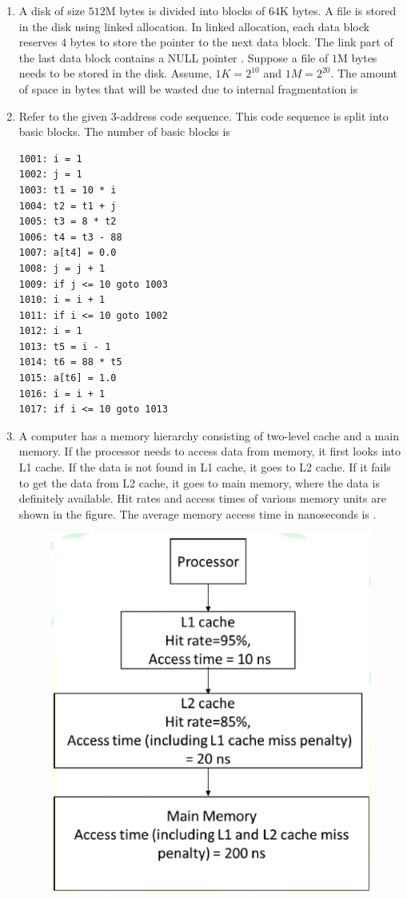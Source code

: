 \documentclass[a4paper, 11pt]{article}
\begin{document}
\begin{enumerate}
    \hfill{}

    \item A disk of size $512$M bytes is divided into blocks of $64$K bytes. A file is stored in the disk using linked allocation. In linked allocation, each data block reserves $4$ bytes to store the pointer to the next data block. The link part of the last data block contains a NULL pointer . Suppose a file of $1$M bytes needs to be stored in the disk. Assume, $1K=2^{10}$ and $1M=2^{20}$. The amount of space in bytes that will be wasted due to internal fragmentation is \underline{\hspace{2cm}} 

    \hfill{}

    \item Refer to the given 3-address code sequence. This code sequence is split into basic blocks. The number of basic blocks is \underline{\hspace{2cm}} 
    
    \begin{lstlisting}
1001: i = 1
1002: j = 1
1003: t1 = 10 * i
1004: t2 = t1 + j
1005: t3 = 8 * t2
1006: t4 = t3 - 88
1007: a[t4] = 0.0
1008: j = j + 1
1009: if j <= 10 goto 1003
1010: i = i + 1
1011: if i <= 10 goto 1002
1012: i = 1
1013: t5 = i - 1
1014: t6 = 88 * t5
1015: a[t6] = 1.0
1016: i = i + 1
1017: if i <= 10 goto 1013
    \end{lstlisting}
    \hfill{}
    \item A computer has a memory hierarchy consisting of two-level cache  and a main memory. If the processor needs to access data from memory, it first looks into L1 cache. If the data is not found in L1 cache, it goes to L2 cache. If it fails to get the data from L2 cache, it goes to main memory, where the data is definitely available. Hit rates and access times of various memory units are shown in the figure. The average memory access time in nanoseconds  is \underline{\hspace{2cm}}. 
    \begin{figure}[H]
        \centering
        \includegraphics[width=0.5\columnwidth]{figs/q53.png}
        \label{fig:q53}
    \end{figure}


\end{enumerate}
\end{document}
